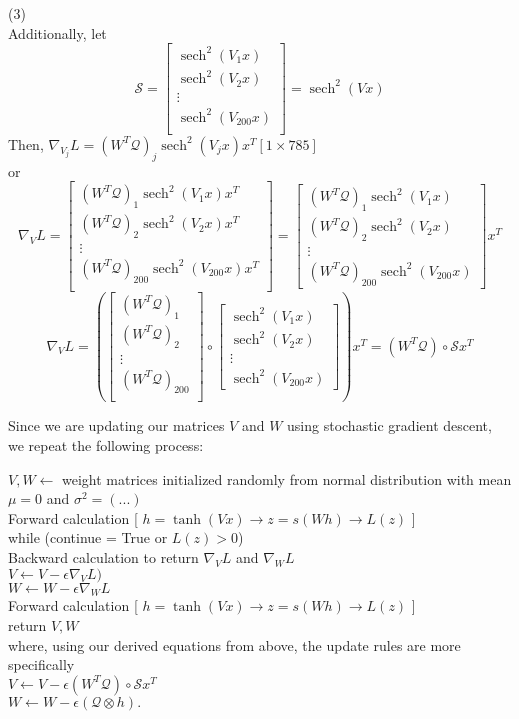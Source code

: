 \documentclass{report}
\DeclareMathOperator{\sech}{sech} %
\newcommand{\tab}{\-\hspace{0.5cm}}
\newcommand{\sep}{\-\hspace{0.3cm}}
\begin{document}
(3)\\
Additionally, let
$$ \mathcal{S} = \begin{bmatrix}
\sech^2(V_1 x) \\
\sech^2(V_2 x) \\
\vdots \\
\sech^2(V_{200} x)\\
\end{bmatrix} = \sech^2(Vx) $$
Then, $\nabla_{V_j} L = (W^T \mathcal{Q})_j \sech^2(V_jx)x^T $\tab\footnotesize$[1\times785]$\normalsize\\
\tab or
$$ \nabla_{V} L = \begin{bmatrix}
(W^T \mathcal{Q})_1 \sech^2(V_1 x)x^T \\
(W^T \mathcal{Q})_2 \sech^2(V_2 x)x^T \\
\vdots \\
(W^T \mathcal{Q})_{200} \sech^2(V_{200}x)x^T \\
\end{bmatrix} = \begin{bmatrix}
(W^T \mathcal{Q})_1 \sech^2(V_1 x) \\
(W^T \mathcal{Q})_2 \sech^2(V_2 x) \\
\vdots \\
(W^T \mathcal{Q})_{200} \sech^2(V_{200}x)
\end{bmatrix} x^T $$
$$\nabla_{V} L = \left(\begin{bmatrix}
(W^T \mathcal{Q})_1 \\
(W^T \mathcal{Q})_2 \\
\vdots \\
(W^T \mathcal{Q})_{200} \\
\end{bmatrix} \circ \begin{bmatrix}
\sech^2(V_1 x) \\
\sech^2(V_2 x) \\
\vdots \\
\sech^2(V_{200}x)
\end{bmatrix}\right) x^T = (W^T \mathcal{Q}) \circ \mathcal{S} x^T $$

\newpage
Since we are updating our matrices $V$ and $W$ using stochastic gradient descent, we repeat the following process:

\tab $V,W \leftarrow$ weight matrices initialized randomly from normal distribution with mean $\mu=0$ and $
\sigma^2 = (...)$\\
\tab Forward calculation [ $h = \tanh(Vx)$\sep$\rightarrow$\sep$z = s(Wh)$\sep$\rightarrow$\sep$L(z)$ ]\\
\tab while (continue = True or $L(z) > 0$) \\
\tab \tab \tab Backward calculation to return $\nabla_V L$ and $\nabla_W L$\\
\tab \tab \tab $V \leftarrow V - \epsilon \nabla_V L)$ \\
\tab \tab \tab $W \leftarrow W - \epsilon \nabla_W L$ \\
\tab \tab \tab Forward calculation [ $h = \tanh(Vx)$\sep$\rightarrow$\sep$z = s(Wh)$\sep$\rightarrow$\sep$L(z)$ ]\\
\tab return $V,W$ \\

where, using our derived equations from above, the update rules are more specifically\\
\tab \tab \tab \tab $V \leftarrow V - \epsilon(W^T \mathcal{Q}) \circ \mathcal{S} x^T $\\
\tab \tab \tab \tab $ W \leftarrow W - \epsilon(\mathcal{Q} \otimes h). $
\end{document}

